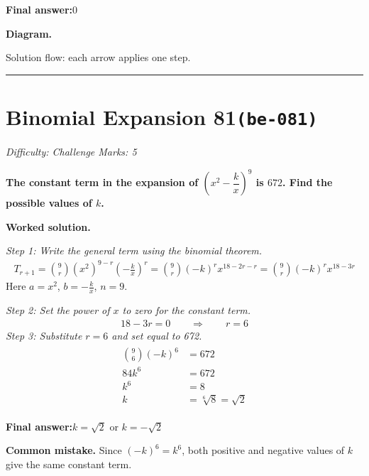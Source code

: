 \documentclass[11pt]{article}
\newcommand{\question}[1]{\par\medskip\noindent\textbf{#1}\par}
\begin{document}
\begin{answerbox}
\textbf{Final answer:}\quad \(\displaystyle 0\)
\end{answerbox}
\textbf{Diagram.}

\begin{center}
\end{center}
\small Solution flow: each arrow applies one step.\normalsize

\medskip\hrule

\section*{Binomial Expansion 81\quad\small\texttt{(be-081)}}
\textit{Difficulty: Challenge \quad\textbar\quad Marks: 5}

\question{The constant term in the expansion of \( \left(x^2 - \dfrac{k}{x}\right)^9 \) is \( 672 \). Find the possible values of \( k \).}

\textbf{Worked solution.}

\textit{Step 1: Write the general term using the binomial theorem.}
\[\begin{gathered}
T_{r+1} = \binom{9}{r}(x^2)^{9-r}\left(-\frac{k}{x}\right)^r = \binom{9}{r}(-k)^r x^{18-2r-r} = \binom{9}{r}(-k)^r x^{18-3r}
\end{gathered}\]
Here \(a = x^2\), \(b = -\frac{k}{x}\), \(n = 9\).

\textit{Step 2: Set the power of \(x\) to zero for the constant term.}
\[\begin{gathered}
18 - 3r = 0 \quad\quad \Rightarrow \quad\quad r = 6
\end{gathered}\]
\textit{Step 3: Substitute \(r = 6\) and set equal to 672.}
\[\begin{gathered}
\begin{aligned} \binom{9}{6}(-k)^6 &= 672 \\ 84k^6 &= 672 \\ k^6 &= 8 \\ k &= \sqrt[6]{8} = \sqrt{2} \end{aligned}
\end{gathered}\]
\begin{answerbox}
\textbf{Final answer:}\quad \(\displaystyle k = \sqrt{2}\) or \(\displaystyle k = -\sqrt{2}\)
\end{answerbox}
\textbf{Common mistake.} Since \((-k)^6 = k^6\), both positive and negative values of \(k\) give the same constant term.
\end{document}
